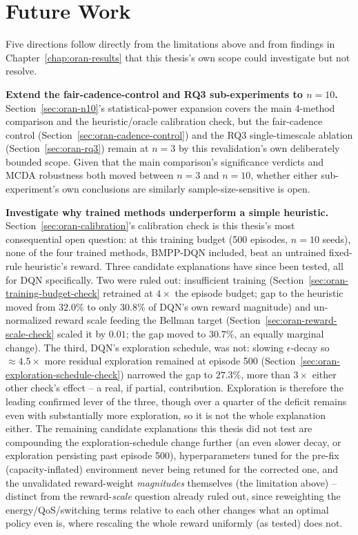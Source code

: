 \section{Future Work}
\label{sec:oran-future-work}

Five directions follow directly from the limitations above and from
findings in Chapter~\ref{chap:oran-results} that this thesis's own scope
could investigate but not resolve.

\textbf{Extend the fair-cadence-control and RQ3 sub-experiments to
$n=10$.} Section~\ref{sec:oran-n10}'s statistical-power expansion covers
the main 4-method comparison and the heuristic/oracle calibration check,
but the fair-cadence control (Section~\ref{sec:oran-cadence-control}) and
the RQ3 single-timescale ablation (Section~\ref{sec:oran-rq3}) remain at
$n=3$ by this revalidation's own deliberately bounded scope. Given that
the main comparison's significance verdicts and MCDA robustness both
moved between $n=3$ and $n=10$, whether either sub-experiment's own
conclusions are similarly sample-size-sensitive is open.

\textbf{Investigate why trained methods underperform a simple heuristic.}
Section~\ref{sec:oran-calibration}'s calibration check is this thesis's
most consequential open question: at this training budget (500 episodes,
$n=10$ seeds), none of the four trained methods, BMPP-DQN included, beat an
untrained fixed-rule heuristic's reward. Three candidate explanations
have since been tested, all for DQN specifically. Two were ruled out:
insufficient training (Section~\ref{sec:oran-training-budget-check}
retrained at $4\times$ the episode budget; gap to the heuristic moved
from $32.0\%$ to only $30.8\%$ of DQN's own reward magnitude) and
un-normalized reward scale feeding the Bellman target
(Section~\ref{sec:oran-reward-scale-check} scaled it by $0.01$; the gap
moved to $30.7\%$, an equally marginal change). The third, DQN's
exploration schedule, was not: slowing $\epsilon$-decay so $\approx
4.5\times$ more residual exploration remained at episode 500
(Section~\ref{sec:oran-exploration-schedule-check}) narrowed the gap to
$27.3\%$, more than $3\times$ either other check's effect -- a real,
if partial, contribution. Exploration is therefore the leading
confirmed lever of the three, though over a quarter of the deficit
remains even with substantially more exploration, so it is not the
whole explanation either. The remaining candidate explanations this
thesis did not test are compounding the exploration-schedule change
further (an even slower decay, or exploration persisting past episode
500), hyperparameters tuned for the pre-fix (capacity-inflated)
environment never being retuned for the corrected one, and the
unvalidated reward-weight \emph{magnitudes} themselves (the limitation
above) -- distinct from the reward-\emph{scale} question already ruled
out, since reweighting the energy/QoS/switching terms relative to each
other changes what an optimal policy even is, where rescaling the whole
reward uniformly (as tested) does not.


